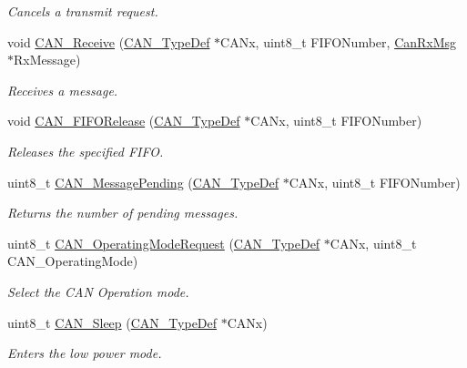 \begin{DoxyCompactItemize}
\begin{DoxyCompactList}\small\item\em Cancels a transmit request. \end{DoxyCompactList}\item 
void \hyperlink{group___c_a_n___private___functions_ga351b90bb8a3bb0c846f85bbd56ef4dc8}{C\+A\+N\+\_\+\+Receive} (\hyperlink{struct_c_a_n___type_def}{C\+A\+N\+\_\+\+Type\+Def} $\ast$C\+A\+Nx, uint8\+\_\+t F\+I\+F\+O\+Number, \hyperlink{struct_can_rx_msg}{Can\+Rx\+Msg} $\ast$Rx\+Message)
\begin{DoxyCompactList}\small\item\em Receives a message. \end{DoxyCompactList}\item 
void \hyperlink{group___c_a_n___private___functions_ga1bc3b39471e579b4101624c33d27918b}{C\+A\+N\+\_\+\+F\+I\+F\+O\+Release} (\hyperlink{struct_c_a_n___type_def}{C\+A\+N\+\_\+\+Type\+Def} $\ast$C\+A\+Nx, uint8\+\_\+t F\+I\+F\+O\+Number)
\begin{DoxyCompactList}\small\item\em Releases the specified F\+I\+FO. \end{DoxyCompactList}\item 
uint8\+\_\+t \hyperlink{group___c_a_n___private___functions_ga7100459a95ce1b3cfe8ab15e112029fe}{C\+A\+N\+\_\+\+Message\+Pending} (\hyperlink{struct_c_a_n___type_def}{C\+A\+N\+\_\+\+Type\+Def} $\ast$C\+A\+Nx, uint8\+\_\+t F\+I\+F\+O\+Number)
\begin{DoxyCompactList}\small\item\em Returns the number of pending messages. \end{DoxyCompactList}\item 
uint8\+\_\+t \hyperlink{group___c_a_n___private___functions_gab2a3630e9e3024114eb117d14e514208}{C\+A\+N\+\_\+\+Operating\+Mode\+Request} (\hyperlink{struct_c_a_n___type_def}{C\+A\+N\+\_\+\+Type\+Def} $\ast$C\+A\+Nx, uint8\+\_\+t C\+A\+N\+\_\+\+Operating\+Mode)
\begin{DoxyCompactList}\small\item\em Select the C\+AN Operation mode. \end{DoxyCompactList}\item 
uint8\+\_\+t \hyperlink{group___c_a_n___private___functions_ga640215e38765759d7eceb8a039046667}{C\+A\+N\+\_\+\+Sleep} (\hyperlink{struct_c_a_n___type_def}{C\+A\+N\+\_\+\+Type\+Def} $\ast$C\+A\+Nx)
\begin{DoxyCompactList}\small\item\em Enters the low power mode. \end{DoxyCompactList}\item 

\end{DoxyCompactItemize}
